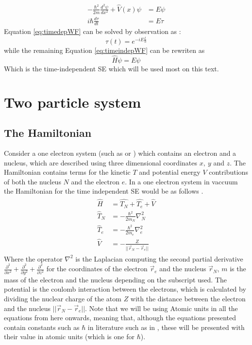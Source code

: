 \documentclass[../master_thesis.tex]{subfiles}
\begin{document}
\begin{subequations}
  \label{eq:sysSE}
  \begin{align}
    -\frac{\hbar^2}{2m}\frac{d^2\psi}{d x^2} + \hat{V}(x)\psi &= E\psi  \label{eq:timeindepWF}\\
    i\hbar\frac{d\tau}{d t} &= E\tau  \label{eq:timedepWF}
  \end{align}
\end{subequations}
Equation \ref{eq:timedepWF} can be solved by observation as \cite{Atkins:2011, Cohen:1973} :
\begin{equation}
  \tau(t) = e^{-iE\frac{t}{\hbar}}
\end{equation}
while the remaining Equation \ref{eq:timeindepWF} can be rewriten as
\begin{equation}
  \hat{H}\psi = E\psi\label{eq:timeindepSE}
\end{equation}
Which is the time-independent \ac{SE} which will be used most on this text.

\section{Two particle system}
\subsection{The Hamiltonian}
Consider a one electron system (such as  or ) which contains an
electron and a nucleus, which are described using three dimensional coordinates
$ x,\ y $ and $ z $. The Hamiltonian contains terms for the kinetic $T$ and
potential energy $V$ contributions of both the nucleus $ N $ and the electron
$ e $. In a one electron system in vaccuum the Hamiltonian for the time independent
\ac{SE} would be as follows \cite{Jensen:2017, Cramer:2004}.
\begin{align}
  \begin{split}
    \hat{H}   &= \hat{T_N} + \hat{T_e} + \hat{V} \\
    \hat{T}_N &= -\frac{\hbar^2}{2m_N}\nabla^2_N \\
    \hat{T}_e &= -\frac{\hbar^2}{2m_e}\nabla^2_e \\
    \hat{V}   &= -\frac{Z}{||\vec{r}_N - \vec{r}_e||} \label{eq:twopH}
  \end{split}
\end{align}
Where the operator $ \nabla^2$ is the Laplacian computing the second partial
derivative $ \frac{\partial^2}{\partial x^2} + \frac{\partial^2}{\partial y^2} +
\frac{\partial^2}{\partial z^2} $ for the coordinates of the electron $\vec{r}_e$
and the nucleus $\vec{r}_N$, $ m $ is the mass of the electron and the nucleus
depending on the subscript used. The potential is the coulomb interaction
between the electrons, which is calculated by dividing the nuclear charge of the
atom $ Z $ with the distance between the electron and the nucleus
$ ||\vec{r}_N - \vec{r}_e|| $. Note that we will be using Atomic units in all
the equations from here onwards, meaning that, although the equations presented
contain constants such as $\hbar$ in literature such as in \cite{Atkins:2014},
these will be presented with their value in atomic units (which is one for
$\hbar$).
\end{document}
